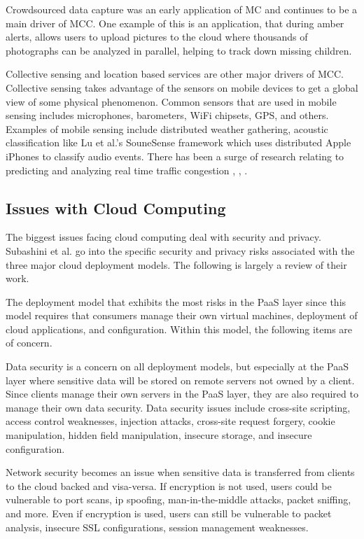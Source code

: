 \documentclass[]{article}
\begin{document}
Crowdsourced data capture was an early application of MC\cite{campbell_rise_2008} and continues to be a main driver of MCC. One example of this is an application, that during amber alerts, allows users to upload pictures to the cloud where thousands of photographs can be analyzed in parallel, helping to track down missing children\cite{satyanarayanan_mobile_2010}.

Collective sensing and location based services are other major drivers of MCC. Collective sensing takes advantage of the sensors on mobile devices to get a global view of some physical phenomenon. Common sensors that are used in mobile sensing includes microphones, barometers, WiFi chipsets, GPS, and others. Examples of mobile sensing include distributed weather gathering, acoustic classification like Lu et al.'s\cite{lu_soundsense:_2009} SouneSense framework which uses distributed Apple iPhones to classify audio events. There has been a surge of research relating to predicting and analyzing real time traffic congestion \cite{thiagarajan_vtrack:_2009}, \cite{herring_using_2010}, \cite{hunter_scaling_2011}. 



\subsection{Issues with Cloud Computing} \label{ssec:issues-with-cloud-computing}
The biggest issues facing cloud computing deal with security and privacy. Subashini et al.\cite{subashini_survey_2011} go into the specific security and privacy risks associated with the three major cloud deployment models. The following is largely a review of their work. 

The deployment model that exhibits the most risks in the PaaS layer since this model requires that consumers manage their own virtual machines, deployment of cloud applications, and configuration. Within this model, the following items are of concern. 

Data security is a concern on all deployment models, but especially at the PaaS layer where sensitive data will be stored on remote servers not owned by a client. Since clients manage their own servers in the PaaS layer, they are also required to manage their own data security. Data security issues include cross-site scripting, access control weaknesses, injection attacks, cross-site request forgery, cookie manipulation, hidden field manipulation, insecure storage, and insecure configuration.

Network security becomes an issue when sensitive data is transferred from clients to the cloud backed and visa-versa. If encryption is not used, users could be vulnerable to port scans, ip spoofing, man-in-the-middle attacks, packet sniffing, and more. Even if encryption is used, users can still be vulnerable to packet analysis, insecure SSL configurations, session management weaknesses.
\end{document}
